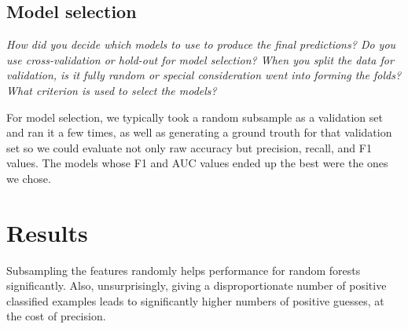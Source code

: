 \documentclass[11pt,a4paper]{article}
\begin{document}
\subsection{Model selection}
\textit{How did you decide which models to use to produce the final predictions?  Do you use cross-validation or hold-out for model selection? When you split the data for validation, is it fully random or special consideration went into forming the folds? What criterion is used to select the models?}

For model selection, we typically took a random subsample as a validation set and ran it a few times, as well as generating a ground trouth for that validation set so we could evaluate not only raw accuracy but precision, recall, and F1 values. The models whose F1 and AUC values ended up the best were the ones we chose.

\section{Results}

Subsampling the features randomly helps performance for random forests significantly. Also, unsurprisingly, giving a disproportionate number of positive classified examples leads to significantly higher numbers of positive guesses, at the cost of precision.
\end{document}
